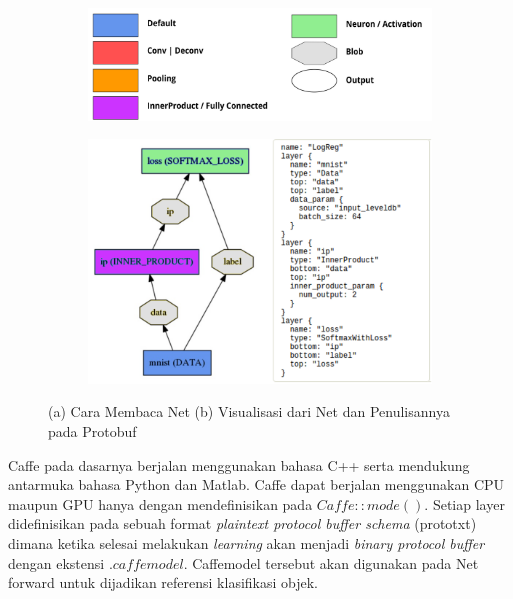 \begin{figure}[ht]
  \centering
  \begin{subfigure}[b]{0.9\textwidth}
     \includegraphics[width=\textwidth]{ketlayer}
     \caption{}
  \end{subfigure}             
  \begin{subfigure}[b]{0.7\textwidth}
    \includegraphics[width=\textwidth]{visualisasi_protobuf}
    \caption{}
  \end{subfigure}
  \caption{(a) Cara Membaca Net (b) Visualisasi dari Net dan Penulisannya pada Protobuf}
  \label{fig:ketlayer}
\end{figure}

Caffe pada dasarnya berjalan menggunakan bahasa C++ serta mendukung antarmuka bahasa Python dan Matlab. Caffe dapat berjalan menggunakan CPU maupun GPU hanya dengan mendefinisikan pada $Caffe::mode()$. Setiap layer didefinisikan pada sebuah format \textit{plaintext protocol buffer schema} (prototxt) dimana ketika selesai melakukan \textit{learning} akan menjadi \textit{binary protocol buffer} dengan ekstensi $.caffemodel$. Caffemodel tersebut akan digunakan pada Net forward untuk dijadikan referensi klasifikasi objek.
